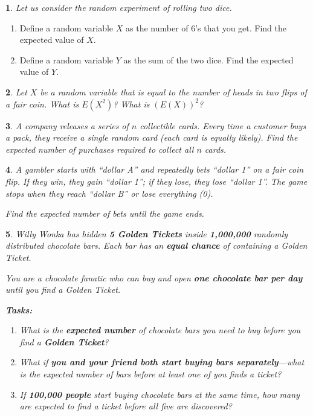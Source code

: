 \documentclass[%
addpoints]{exam}
\theoremstyle{problem}
\newtheorem{p}{}
\begin{document}

\begin{p}
Let us consider the random experiment of rolling two dice.
\hfill \end{p}
\begin{enumerate}
    \item Define a random variable \(X\) as the number of 6's that you get. Find the expected value of \(X\).
    \item Define a random variable \(Y\) as the sum of the two dice. Find the expected value of \(Y\).
\end{enumerate}

\begin{p}
Let \( X \) be a random variable that is equal to the number of heads in two flips of a  
fair coin. What is \( E(X^2) \)? What is \( (E(X))^2 \)?
\hfill \end{p}

\begin{p}
A company releases a series of $n$ collectible cards. Every time a customer buys a pack, they receive a single random card (each card is equally likely). Find the expected number of purchases required to collect all $n$ cards.
\hfill\end{p}

\begin{p}
A gambler starts with ``dollar A'' and repeatedly bets ``dollar 1'' on a fair coin flip. If they win, they gain ``dollar 1''; if they lose, they lose ``dollar 1''. The game stops when they reach ``dollar B'' or lose everything (0). 

Find the expected number of bets until the game ends.
\hfill\end{p}

\begin{p}
Willy Wonka has hidden \textbf{5 Golden Tickets} inside \textbf{1,000,000} randomly distributed chocolate bars. Each bar has an \textbf{equal chance} of containing a Golden Ticket.

You are a chocolate fanatic who can buy and open \textbf{one chocolate bar per day} until you find a Golden Ticket.

\textbf{Tasks:}
\begin{enumerate}
    \item What is the \textbf{expected number} of chocolate bars you need to buy before you find a \textbf{Golden Ticket}?
    \item What if \textbf{you and your friend both start buying bars separately}—what is the expected number of bars before at least one of you finds a ticket?
    \item If \textbf{100,000 people} start buying chocolate bars at the same time, how many are expected to find a ticket before all five are discovered?
\end{enumerate}
\hfill\end{p}
\end{document}
